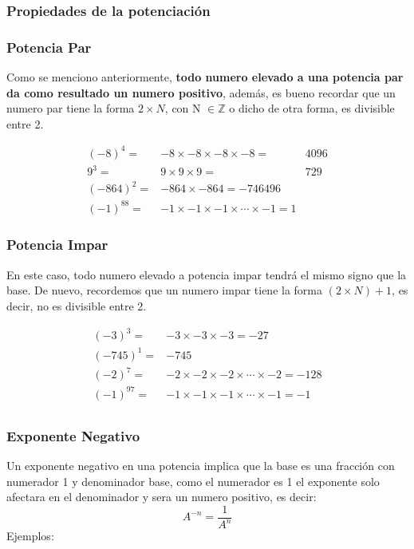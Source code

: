 \subsubsection*{Propiedades de la potenciación}
    \subsubsection*{Potencia Par}
        Como se menciono anteriormente, \textbf{todo numero elevado a una potencia
        par da como resultado un numero positivo}, además, es bueno recordar que
        un numero par tiene la forma $2\times N$, con N $\in \mathbb{Z}$ o dicho
        de otra forma, es divisible entre 2.

        \begin{align*}
            (-8)^{4} =& -8\times-8\times-8\times-8 =& 4096\\
            9^3=& 9\times9\times9 =& 729\\
            (-864)^2  =& -864\times-864 = -746496\\
            (-1)^88 =& -1\times-1\times-1\times \cdots \times -1 = 1
        \end{align*}

    \subsubsection*{Potencia Impar}
        En este caso, todo numero elevado a potencia impar tendrá el mismo signo
        que la base. De nuevo, recordemos que un numero impar tiene la forma
        $(2\times N)+1$, es decir, no es divisible entre 2.

        \begin{align*}
            (-3)^3 =& -3\times-3\times-3 = -27\\
            (-745)^1 =& -745\\
            (-2)^{7} =& -2\times-2\times-2\times \cdots \times -2 = -128\\
            (-1)^{97} =& -1\times -1\times-1\times\cdots\times -1 = -1\\
        \end{align*}


    \subsubsection*{Exponente Negativo}
        Un exponente negativo en una potencia implica que la base es una fracción
        con numerador 1 y denominador base, como el numerador es 1 el exponente
        solo afectara en el denominador y sera un numero positivo, es decir:
        $$A^{-n}= \frac{1}{A^n} $$
        Ejemplos:

